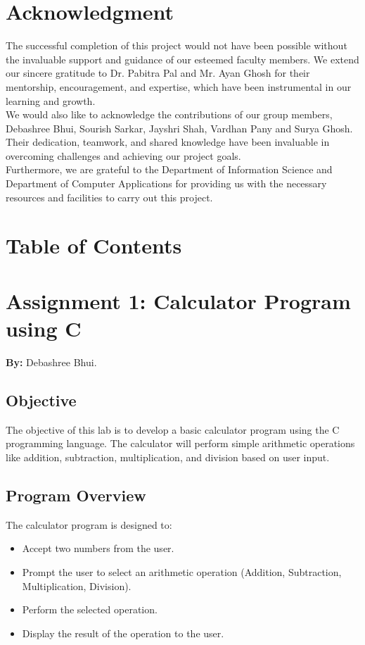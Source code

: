 \documentclass[a4paper,12pt]{article}
\begin{document}
    \section*{Acknowledgment}
    
    The successful completion of this project would not have been possible without the invaluable support and guidance of our esteemed faculty          members. We extend our sincere gratitude to Dr. Pabitra Pal and Mr. Ayan Ghosh for their mentorship, encouragement, and expertise, which have       been instrumental in our learning and growth.\\

    We would also like to acknowledge the contributions of our group members, Debashree Bhui, Sourish Sarkar, Jayshri Shah, Vardhan Pany and Surya Ghosh. Their dedication, teamwork, and shared knowledge have been invaluable in overcoming challenges and achieving our project goals.\\

Furthermore, we are grateful to the Department of Information Science and Department of Computer Applications for providing us with the necessary resources and facilities to carry out this project.

    \section*{Table of Contents}
\tableofcontents
\newpage

\section{Assignment 1: Calculator Program using C}
\textbf{By:} Debashree Bhui.


\subsection{Objective}
The objective of this lab is to develop a basic calculator program using the C programming language. The calculator will perform simple arithmetic operations like addition, subtraction, multiplication, and division based on user input.

\subsection{Program Overview}
The calculator program is designed to:
\begin{itemize}
    \item Accept two numbers from the user.
    \item Prompt the user to select an arithmetic operation (Addition, Subtraction, Multiplication, Division).
    \item Perform the selected operation.
    \item Display the result of the operation to the user.
\end{itemize}
\end{document}
